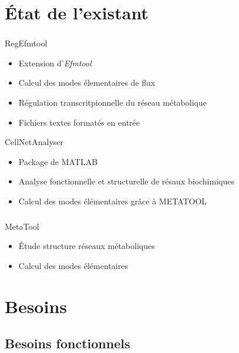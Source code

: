 \documentclass[11pt]{beamer}
\begin{document}
\section{État de l'existant}			

\begin{frame}
	\frametitle{\secname}
	\begin{block}{RegEfmtool}
	\begin{itemize}
	\item Extension d'\textit{Efmtool}
	\item Calcul des modes élementaires de flux
	\item Régulation transcritpionnelle du réseau métabolique
	\item Fichiers textes formatés en entrée
	\end{itemize}
	\end{block}
	\begin{block}{CellNetAnalyser}
	\begin{itemize}
	\item Package de MATLAB
	\item Analyse fonctionnelle et structurelle de résaux biochimiques
	\item Calcul des modes élémentaires grâce à METATOOL
	\end{itemize}
	\end{block}
\end{frame}

\begin{frame}
\frametitle{\secname}
	\begin{block}{MetaTool}
	\begin{itemize}
	\item Étude structure réseaux métaboliques
	\item Calcul des modes élémentaires
	
	\end{itemize}
	\end{block}	
\end{frame}

\section{Besoins	}	

\subsection{Besoins fonctionnels}
\end{document}
